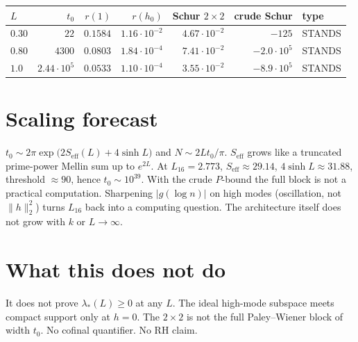 \documentclass[11pt]{article}
\theoremstyle{remark}
\begin{document}
\begin{center}
\small
\begin{tabular}{@{}lrrrrrl@{}}
\toprule
$L$ & $t_0$ & $r(1)$ & $r(h_0)$ & Schur $2\times2$ & crude Schur & type\\
\midrule
$0.30$ & $22$ & $0.1584$ & $1.16\cdot10^{-2}$ & $4.67\cdot10^{-2}$ & $-125$ & STANDS\\
$0.80$ & $4300$ & $0.0803$ & $1.84\cdot10^{-4}$ & $7.41\cdot10^{-2}$ & $-2.0\cdot10^{5}$ & STANDS\\
$1.0$ & $2.44\cdot10^{5}$ & $0.0533$ & $1.10\cdot10^{-4}$ & $3.55\cdot10^{-2}$ & $-8.9\cdot10^{5}$ & STANDS\\
\bottomrule
\end{tabular}
\end{center}

\section{Scaling forecast}

$t_0\sim2\pi\exp\bigl(2S_{\mathrm{eff}}(L)+4\sinh L\bigr)$
and $N\sim 2Lt_0/\pi$.  $S_{\mathrm{eff}}$ grows like a truncated
prime-power Mellin sum up to $e^{2L}$.  At $L_{16}=2.773$,
$S_{\mathrm{eff}}\approx29.14$, $4\sinh L\approx31.88$,
threshold $\approx90$, hence $t_0\sim10^{39}$.  With the crude
$P$-bound the full block is not a practical computation.
Sharpening $|g(\log n)|$ on high modes (oscillation, not
$\|h\|_2^2$) turns $L_{16}$ back into a computing question.
The architecture itself does not grow with $k$ or $L\to\infty$.

\section{What this does not do}

It does not prove $\lambda_*(L)\ge0$ at any $L$.  The ideal
high-mode subspace meets compact support only at $h=0$.
The $2\times2$ is not the full Paley--Wiener block of width $t_0$.
No cofinal quantifier.  No RH claim.
\end{document}

